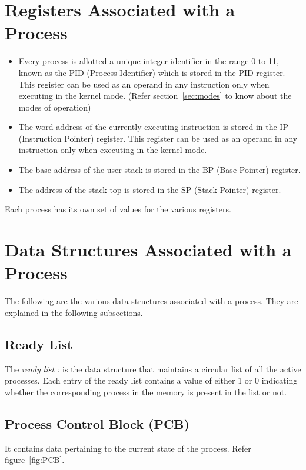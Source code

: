 \documentclass[11pt]{report}
\begin{document}
\section{Registers Associated with a Process}
\label{register details}
\begin{itemize}
	\item Every process is allotted a unique integer identifier in the range 0 to 11, known as the PID (Process Identifier) which is stored in the PID register. This register can be used as an operand in any instruction only when executing in the kernel mode. (Refer section~\ref{sec:modes} to know about the modes of operation)
	\item The word address of the currently executing instruction is stored in the IP (Instruction Pointer) register. This register can be used as an operand in any instruction only when executing in the kernel mode.
	\item The base address of the user stack is stored in the BP (Base Pointer) register. 
	\item The address of the stack top is stored in the SP (Stack Pointer) register. 
\end{itemize}
Each process has its own set of values for the various registers.

\section{Data Structures Associated with a Process}

The following are the various data structures associated with a process. They are explained in the following subsections.

\subsection{Ready List}
\label{lbl:rdylst}
The \textit{ready list :} is the data structure that maintains a circular list of all the active processes. Each entry of the ready list contains a value of either 1 or 0 indicating whether the corresponding process in the memory is present in the list or not.

\subsection{Process Control Block (PCB)}
\label{sec:pcb}
It contains data pertaining to the current state of the process. Refer figure~\ref{fig:PCB}.\\
\end{document}
